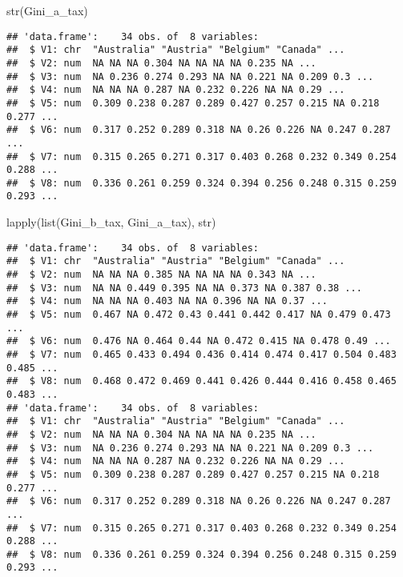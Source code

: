 \documentclass[
]{article}
\newenvironment{Shaded}{\begin{snugshade}}{\end{snugshade}}
\newcommand{\FunctionTok}[1]{\textcolor[rgb]{0.00,0.00,0.00}{#1}}
\newcommand{\NormalTok}[1]{#1}
\begin{document}
\begin{Shaded}
\begin{Highlighting}[]
\FunctionTok{str}\NormalTok{(Gini\_a\_tax)}
\end{Highlighting}
\end{Shaded}

\begin{verbatim}
## 'data.frame':    34 obs. of  8 variables:
##  $ V1: chr  "Australia" "Austria" "Belgium" "Canada" ...
##  $ V2: num  NA NA NA 0.304 NA NA NA NA 0.235 NA ...
##  $ V3: num  NA 0.236 0.274 0.293 NA NA 0.221 NA 0.209 0.3 ...
##  $ V4: num  NA NA NA 0.287 NA 0.232 0.226 NA NA 0.29 ...
##  $ V5: num  0.309 0.238 0.287 0.289 0.427 0.257 0.215 NA 0.218 0.277 ...
##  $ V6: num  0.317 0.252 0.289 0.318 NA 0.26 0.226 NA 0.247 0.287 ...
##  $ V7: num  0.315 0.265 0.271 0.317 0.403 0.268 0.232 0.349 0.254 0.288 ...
##  $ V8: num  0.336 0.261 0.259 0.324 0.394 0.256 0.248 0.315 0.259 0.293 ...
\end{verbatim}

\begin{Shaded}
\begin{Highlighting}[]
\FunctionTok{lapply}\NormalTok{(}\FunctionTok{list}\NormalTok{(Gini\_b\_tax, Gini\_a\_tax), str)}
\end{Highlighting}
\end{Shaded}

\begin{verbatim}
## 'data.frame':    34 obs. of  8 variables:
##  $ V1: chr  "Australia" "Austria" "Belgium" "Canada" ...
##  $ V2: num  NA NA NA 0.385 NA NA NA NA 0.343 NA ...
##  $ V3: num  NA NA 0.449 0.395 NA NA 0.373 NA 0.387 0.38 ...
##  $ V4: num  NA NA NA 0.403 NA NA 0.396 NA NA 0.37 ...
##  $ V5: num  0.467 NA 0.472 0.43 0.441 0.442 0.417 NA 0.479 0.473 ...
##  $ V6: num  0.476 NA 0.464 0.44 NA 0.472 0.415 NA 0.478 0.49 ...
##  $ V7: num  0.465 0.433 0.494 0.436 0.414 0.474 0.417 0.504 0.483 0.485 ...
##  $ V8: num  0.468 0.472 0.469 0.441 0.426 0.444 0.416 0.458 0.465 0.483 ...
## 'data.frame':    34 obs. of  8 variables:
##  $ V1: chr  "Australia" "Austria" "Belgium" "Canada" ...
##  $ V2: num  NA NA NA 0.304 NA NA NA NA 0.235 NA ...
##  $ V3: num  NA 0.236 0.274 0.293 NA NA 0.221 NA 0.209 0.3 ...
##  $ V4: num  NA NA NA 0.287 NA 0.232 0.226 NA NA 0.29 ...
##  $ V5: num  0.309 0.238 0.287 0.289 0.427 0.257 0.215 NA 0.218 0.277 ...
##  $ V6: num  0.317 0.252 0.289 0.318 NA 0.26 0.226 NA 0.247 0.287 ...
##  $ V7: num  0.315 0.265 0.271 0.317 0.403 0.268 0.232 0.349 0.254 0.288 ...
##  $ V8: num  0.336 0.261 0.259 0.324 0.394 0.256 0.248 0.315 0.259 0.293 ...
\end{verbatim}
\end{document}
